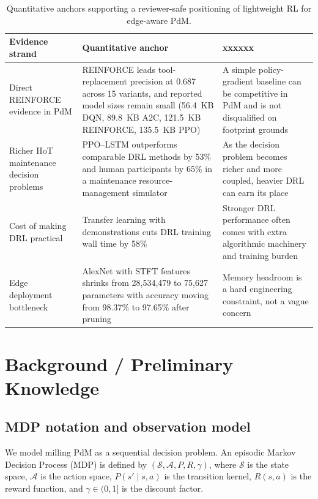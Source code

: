 \documentclass[sn-basic]{sn-jnl} %
\begin{document}
\begin{table}[t]
        \centering
        \small
        \setlength{\tabcolsep}{4pt}
        \begin{tabular}{p{} p{} p{}}
                \toprule
                Evidence strand & Quantitative anchor & xxxxxx \\
                \midrule
                Direct REINFORCE evidence in PdM & REINFORCE leads tool-replacement precision at 0.687 across 15 variants, and reported model sizes remain small (56.4~KB DQN, 89.8~KB A2C, 121.5~KB REINFORCE, 135.5~KB PPO) \cite{Siraskar2025} & A simple policy-gradient baseline can be competitive in PdM and is not disqualified on footprint grounds \\
                Richer IIoT maintenance decision problems & PPO--LSTM outperforms comparable DRL methods by 53\% and human participants by 65\% in a maintenance resource-management simulator \cite{Ong2022-01} & As the decision problem becomes richer and more coupled, heavier DRL can earn its place \\
                Cost of making DRL practical & Transfer learning with demonstrations cuts DRL training wall time by 58\% \cite{Ong2022-02} & Stronger DRL performance often comes with extra algorithmic machinery and training burden \\
                Edge deployment bottleneck & AlexNet with STFT features shrinks from 28,534,479 to 75,627 parameters with accuracy moving from 98.37\% to 97.65\% after pruning \cite{Pandey2023} & Memory headroom is a hard engineering constraint, not a vague concern \\
                \bottomrule
        \end{tabular}
        \caption{Quantitative anchors supporting a reviewer-safe positioning of lightweight RL for edge-aware PdM.}
        \label{tab:quantitative_anchors_lightweight_edge}
\end{table}

\section{Background / Preliminary Knowledge}
\subsection{MDP notation and observation model}
We model milling PdM as a sequential decision problem. An episodic Markov Decision Process (MDP) is defined by $(\mathcal{S},\mathcal{A},P,R,\gamma)$, where $\mathcal{S}$ is the state space, $\mathcal{A}$ is the action space, $P(s'\mid s,a)$ is the transition kernel, $R(s,a)$ is the reward function, and $\gamma\in(0,1]$ is the discount factor.
\end{document}
